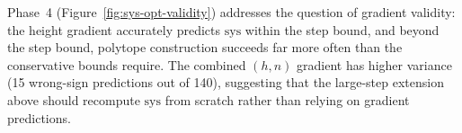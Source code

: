 Phase~4 (Figure~\ref{fig:sys-opt-validity}) addresses the question of
gradient validity: the height gradient accurately predicts $\mathrm{sys}$
within the step bound, and beyond the step bound, polytope construction
succeeds far more often than the conservative bounds require.
The combined $(h,n)$ gradient has higher variance (15 wrong-sign
predictions out of 140), suggesting that the large-step extension above
should recompute $\mathrm{sys}$ from scratch rather than relying on
gradient predictions.

